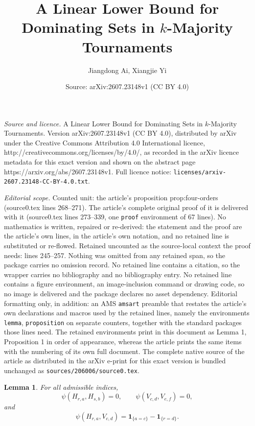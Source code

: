 \documentclass[10pt,a4paper]{amsart}
\title{A Linear Lower Bound for Dominating Sets in $k$-Majority Tournaments}
\author{Jiangdong Ai, Xiangjie Yi}
\date{Source: arXiv:2607.23148v1 (CC BY 4.0)}
\newtheorem{lemma}{Lemma}
\newcommand{\one}{\mathbf{1}}
\begin{document}
\maketitle

\noindent\emph{Source and licence.} A Linear Lower Bound for Dominating Sets in $k$-Majority Tournaments. Version arXiv:2607.23148v1 (CC BY 4.0), distributed by arXiv under the Creative Commons Attribution 4.0 International licence, http://creativecommons.org/licenses/by/4.0/, as recorded in the arXiv licence metadata for this exact version and shown on the abstract page https://arxiv.org/abs/2607.23148v1. Full licence notice: \texttt{licenses/arxiv-2607.23148-CC-BY-4.0.txt}.\par\smallskip

\noindent\textit{Editorial scope.} Counted unit: the article's proposition prop:four-orders (source0.tex lines 268--271). The article's complete original proof of it is delivered with it (source0.tex lines 273--339, one \texttt{proof} environment of 67 lines). No mathematics is written, repaired or re-derived: the statement and the proof are the article's own lines, in the article's own notation, and no retained line is substituted or re-flowed.  Retained uncounted as the source-local context the proof needs: lines 245--257.  Nothing was omitted from any retained span, so the package carries no omission record.  No retained line contains a citation, so the wrapper carries no bibliography and no bibliography entry.  No retained line contains a figure environment, an image-inclusion command or drawing code, so no image is delivered and the package declares no asset dependency.  Editorial formatting only, in addition: an AMS \texttt{amsart} preamble that restates the article's own declarations and macros used by the retained lines, namely the environments \texttt{lemma}, \texttt{proposition} on separate counters, together with the standard packages those lines need.  The retained environments print in this document as Lemma 1, Proposition 1 in order of appearance, whereas the article prints the same items with the numbering of its own full document.  The complete native source of the article as distributed in the arXiv e-print for this exact version is bundled unchanged as \texttt{sources/206006/source0.tex}.
\begin{lemma}\label{lem:psi-values}
For all admissible indices,
\[
  \psi(H_{r,a},H_{s,b})=0,
  \qquad
  \psi(V_{c,d},V_{e,f})=0,
\]
and
\begin{equation}\label{eq:cross-value}
  \psi(H_{r,a},V_{c,d})=
  \one_{\{a=c\}}-\one_{\{r=d\}}.
\end{equation}
\end{lemma}
\end{document}
